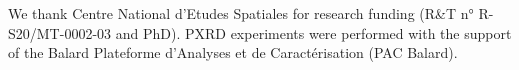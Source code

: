 

We thank Centre National d'Etudes Spatiales for research funding (R\&T n°
R-S20/MT-0002-03 and PhD). PXRD experiments were performed with the support of
the Balard Plateforme d’Analyses et de Caractérisation (PAC Balard).
